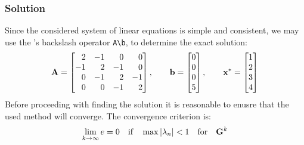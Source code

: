 \subsubsection*{Solution}
Since the considered system of linear equations is simple and consistent, we may use the
\MATLAB's backslash operator \lstinline[style=Matlab-editor]{A\b}, to determine the
exact solution:
\begin{equation*}
  \mathbf{A} = \begin{bmatrix}
    \phantom{-}2 & -1 & \phantom{-}0 & \phantom{-}0 \\
    -1 & \phantom{-}2 & -1 & \phantom{-}0 \\
    \phantom{-}0 & -1 & \phantom{-}2 & -1 \\
    \phantom{-}0 & \phantom{-}0 & -1 & \phantom{-}2
  \end{bmatrix}, \qquad
  \mathbf{b} = \begin{bmatrix}
    0 \\
    0 \\
    0 \\
    5
  \end{bmatrix}, \qquad
  \mathbf{x}^* = \begin{bmatrix}
    1 \\
    2 \\
    3 \\
    4
  \end{bmatrix}
\end{equation*}
Before proceeding with finding the solution it is reasonable to enusre that the used
method will converge. The convergence criterion is:
\begin{equation*}
  \lim_{k\to\infty}{e} = 0
  \quad \text{if} \quad
  \max{\lvert\lambda_n\rvert}<1
  \quad \text{for} \quad
  \mathbf{G}^{k}
\end{equation*}


